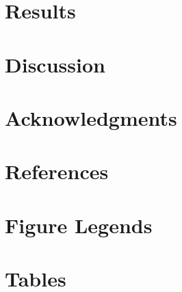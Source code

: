 \documentclass[10pt]{article}
\begin{document}
\section*{Results}


\section*{Discussion}

\section*{Acknowledgments}


\section*{References}


\section*{Figure Legends}


\section*{Tables}
\end{document}

